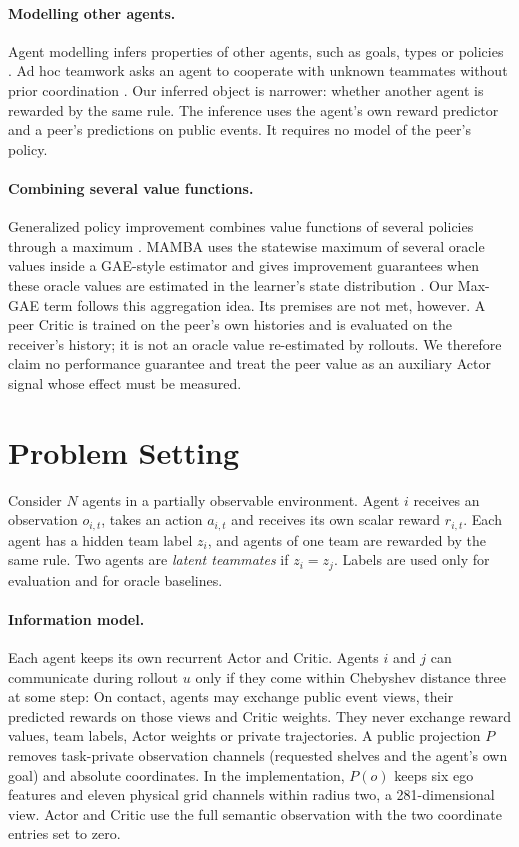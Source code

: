\documentclass{article}
\begin{document}
\paragraph{Modelling other agents.}
Agent modelling infers properties of other agents, such as goals, types or policies \cite{modelling}. Ad hoc teamwork asks an agent to cooperate with unknown teammates without prior coordination \cite{adhoc}. Our inferred object is narrower: whether another agent is rewarded by the same rule. The inference uses the agent's own reward predictor and a peer's predictions on public events. It requires no model of the peer's policy.

\paragraph{Combining several value functions.}
Generalized policy improvement combines value functions of several policies through a maximum \cite{gpi}. MAMBA uses the statewise maximum of several oracle values inside a GAE-style estimator and gives improvement guarantees when these oracle values are estimated in the learner's state distribution \cite{mamba}. Our Max-GAE term follows this aggregation idea. Its premises are not met, however. A peer Critic is trained on the peer's own histories and is evaluated on the receiver's history; it is not an oracle value re-estimated by rollouts. We therefore claim no performance guarantee and treat the peer value as an auxiliary Actor signal whose effect must be measured.

\section{Problem Setting}
Consider $N$ agents in a partially observable environment. Agent $i$ receives an observation $o_{i,t}$, takes an action $a_{i,t}$ and receives its own scalar reward $r_{i,t}$. Each agent has a hidden team label $z_i$, and agents of one team are rewarded by the same rule. Two agents are \emph{latent teammates} if $z_i=z_j$. Labels are used only for evaluation and for oracle baselines.

\paragraph{Information model.}
Each agent keeps its own recurrent Actor and Critic. Agents $i$ and $j$ can communicate during rollout $u$ only if they come within Chebyshev distance three at some step:
\DonorEquation
On contact, agents may exchange public event views, their predicted rewards on those views and Critic weights. They never exchange reward values, team labels, Actor weights or private trajectories. A public projection $P$ removes task-private observation channels (requested shelves and the agent's own goal) and absolute coordinates. In the implementation, $P(o)$ keeps six ego features and eleven physical grid channels within radius two, a 281-dimensional view. Actor and Critic use the full semantic observation with the two coordinate entries set to zero.
\end{document}
